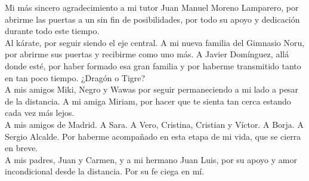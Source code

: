 

Mi más sincero agradecimiento a mi tutor Juan Manuel Moreno Lamparero, por abrirme las puertas a un sin fin de posibilidades, por todo su apoyo y dedicación durante todo este tiempo. \\

Al kárate, por seguir siendo el eje central. A mi nueva familia del Gimnasio Noru, por abrirme sus puertas y recibirme como uno más. A Javier Domínguez, allá donde esté, por haber formado esa gran familia y por haberme transmitido tanto en tan poco tiempo. ¿Dragón o Tigre? \\

A mis amigos Miki, Negro y Wawas por seguir permaneciendo a mi lado a pesar de la distancia. A mi amiga Miriam, por hacer que te sienta tan cerca estando cada vez más lejos. \\

A mis amigos de Madrid. A Sara. A Vero, Cristina, Cristian y Víctor. A Borja. A Sergio Alcalde. Por haberme acompañado en esta etapa de mi vida, que se cierra en breve. \\

A mis padres, Juan y Carmen, y a mi hermano Juan Luis, por su apoyo y amor incondicional desde la distancia. Por su fe ciega en mí. 
